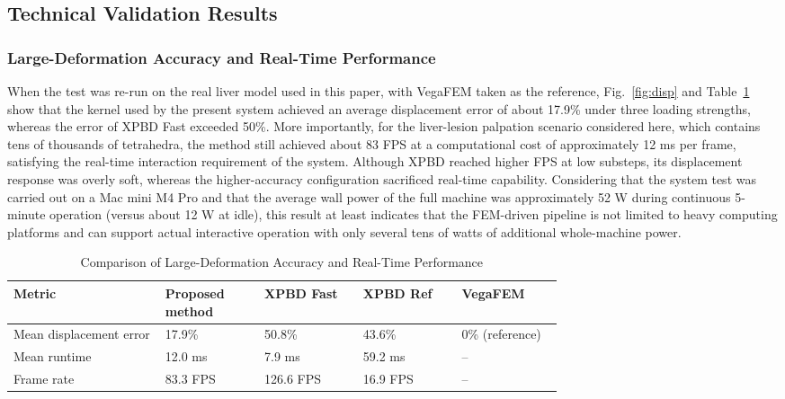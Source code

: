 \documentclass{ieeeaccess}
\begin{document}
\subsection{Technical Validation Results}
\subsubsection{Large-Deformation Accuracy and Real-Time Performance}
When the test was re-run on the real liver model used in this paper, with VegaFEM taken as the reference, Fig.~\ref{fig:disp} and Table~\ref{tab:disp} show that the kernel used by the present system achieved an average displacement error of about 17.9\% under three loading strengths, whereas the error of XPBD Fast exceeded 50\%. More importantly, for the liver-lesion palpation scenario considered here, which contains tens of thousands of tetrahedra, the method still achieved about 83 FPS at a computational cost of approximately 12 ms per frame, satisfying the real-time interaction requirement of the system. Although XPBD reached higher FPS at low substeps, its displacement response was overly soft, whereas the higher-accuracy configuration sacrificed real-time capability. Considering that the system test was carried out on a Mac mini M4 Pro and that the average wall power of the full machine was approximately 52 W during continuous 5-minute operation (versus about 12 W at idle), this result at least indicates that the FEM-driven pipeline is not limited to heavy computing platforms and can support actual interactive operation with only several tens of watts of additional whole-machine power.

\begin{table}[htbp]
\caption{Comparison of Large-Deformation Accuracy and Real-Time Performance}
\label{tab:disp}
\centering
\scriptsize
\renewcommand{\arraystretch}{1.15}
\setlength{\tabcolsep}{4pt}
\begin{tabular}{|p{0.20\linewidth}|p{0.13\linewidth}|p{0.13\linewidth}|p{0.13\linewidth}|p{0.12\linewidth}|}
\hline
Metric & Proposed method & XPBD Fast & XPBD Ref & VegaFEM \\
\hline
Mean displacement error & 17.9\% & 50.8\% & 43.6\% & 0\% (reference) \\
\hline
Mean runtime & 12.0 ms & 7.9 ms & 59.2 ms & -- \\
\hline
Frame rate & 83.3 FPS & 126.6 FPS & 16.9 FPS & -- \\
\hline
\end{tabular}
\end{table}
\end{document}
